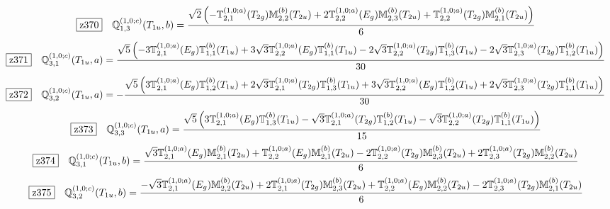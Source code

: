 \documentclass[fleqn,10pt,landscape]{jsarticle}
\begin{document}
\begin{dmath*}
\hspace*{3mm}\fbox{z370}\quad \mathbb{Q}_{1,3}^{(1,0;c)}(T_{1u},b)=\frac{\sqrt{2} \left(- \mathbb{T}_{2,1}^{(1,0;a)}(T_{2g}) \mathbb{M}_{2,2}^{(b)}(T_{2u}) + 2 \mathbb{T}_{2,2}^{(1,0;a)}(E_{g}) \mathbb{M}_{2,3}^{(b)}(T_{2u}) + \mathbb{T}_{2,2}^{(1,0;a)}(T_{2g}) \mathbb{M}_{2,1}^{(b)}(T_{2u})\right)}{6}
\end{dmath*}
\begin{dmath*}
\hspace*{3mm}\fbox{z371}\quad \mathbb{Q}_{3,1}^{(1,0;c)}(T_{1u},a)=\frac{\sqrt{5} \left(- 3 \mathbb{T}_{2,1}^{(1,0;a)}(E_{g}) \mathbb{T}_{1,1}^{(b)}(T_{1u}) + 3 \sqrt{3} \mathbb{T}_{2,2}^{(1,0;a)}(E_{g}) \mathbb{T}_{1,1}^{(b)}(T_{1u}) - 2 \sqrt{3} \mathbb{T}_{2,2}^{(1,0;a)}(T_{2g}) \mathbb{T}_{1,3}^{(b)}(T_{1u}) - 2 \sqrt{3} \mathbb{T}_{2,3}^{(1,0;a)}(T_{2g}) \mathbb{T}_{1,2}^{(b)}(T_{1u})\right)}{30}
\end{dmath*}
\begin{dmath*}
\hspace*{3mm}\fbox{z372}\quad \mathbb{Q}_{3,2}^{(1,0;c)}(T_{1u},a)=- \frac{\sqrt{5} \left(3 \mathbb{T}_{2,1}^{(1,0;a)}(E_{g}) \mathbb{T}_{1,2}^{(b)}(T_{1u}) + 2 \sqrt{3} \mathbb{T}_{2,1}^{(1,0;a)}(T_{2g}) \mathbb{T}_{1,3}^{(b)}(T_{1u}) + 3 \sqrt{3} \mathbb{T}_{2,2}^{(1,0;a)}(E_{g}) \mathbb{T}_{1,2}^{(b)}(T_{1u}) + 2 \sqrt{3} \mathbb{T}_{2,3}^{(1,0;a)}(T_{2g}) \mathbb{T}_{1,1}^{(b)}(T_{1u})\right)}{30}
\end{dmath*}
\begin{dmath*}
\hspace*{3mm}\fbox{z373}\quad \mathbb{Q}_{3,3}^{(1,0;c)}(T_{1u},a)=\frac{\sqrt{5} \left(3 \mathbb{T}_{2,1}^{(1,0;a)}(E_{g}) \mathbb{T}_{1,3}^{(b)}(T_{1u}) - \sqrt{3} \mathbb{T}_{2,1}^{(1,0;a)}(T_{2g}) \mathbb{T}_{1,2}^{(b)}(T_{1u}) - \sqrt{3} \mathbb{T}_{2,2}^{(1,0;a)}(T_{2g}) \mathbb{T}_{1,1}^{(b)}(T_{1u})\right)}{15}
\end{dmath*}
\begin{dmath*}
\hspace*{3mm}\fbox{z374}\quad \mathbb{Q}_{3,1}^{(1,0;c)}(T_{1u},b)=\frac{\sqrt{3} \mathbb{T}_{2,1}^{(1,0;a)}(E_{g}) \mathbb{M}_{2,1}^{(b)}(T_{2u}) + \mathbb{T}_{2,2}^{(1,0;a)}(E_{g}) \mathbb{M}_{2,1}^{(b)}(T_{2u}) - 2 \mathbb{T}_{2,2}^{(1,0;a)}(T_{2g}) \mathbb{M}_{2,3}^{(b)}(T_{2u}) + 2 \mathbb{T}_{2,3}^{(1,0;a)}(T_{2g}) \mathbb{M}_{2,2}^{(b)}(T_{2u})}{6}
\end{dmath*}
\begin{dmath*}
\hspace*{3mm}\fbox{z375}\quad \mathbb{Q}_{3,2}^{(1,0;c)}(T_{1u},b)=\frac{- \sqrt{3} \mathbb{T}_{2,1}^{(1,0;a)}(E_{g}) \mathbb{M}_{2,2}^{(b)}(T_{2u}) + 2 \mathbb{T}_{2,1}^{(1,0;a)}(T_{2g}) \mathbb{M}_{2,3}^{(b)}(T_{2u}) + \mathbb{T}_{2,2}^{(1,0;a)}(E_{g}) \mathbb{M}_{2,2}^{(b)}(T_{2u}) - 2 \mathbb{T}_{2,3}^{(1,0;a)}(T_{2g}) \mathbb{M}_{2,1}^{(b)}(T_{2u})}{6}
\end{dmath*}
\end{document}
